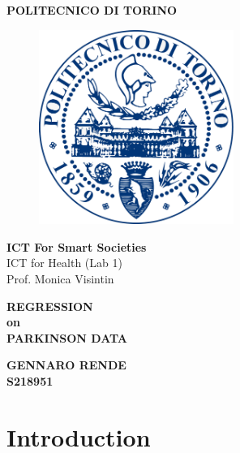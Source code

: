 \documentclass[12pt]{report}
\begin{document}

\begin{center}
\textbf{\Huge POLITECNICO DI TORINO}

\begin{figure}[H]
  \centering
  \includegraphics[width=2.5in]{poli.png}
\end{figure}

\end{center}
\begin{center}
\vspace{0.05in}
\Large{\textbf{ICT For Smart Societies}\\
\vspace{0.08in}
\Large ICT for Health (Lab 1)}\\
\large Prof. Monica Visintin
\end{center}
\begin{center}
\vspace{0.08in}
\end{center}

\begin{center}
\textbf{\Huge REGRESSION\\ on\\ PARKINSON DATA\\}
\end{center}


\begin{center}
\vspace{1in}
\textbf{\Large GENNARO RENDE}\\
\textbf{S218951}\\
\end{center}


\pagebreak


\tableofcontents


\chapter{Introduction}
\end{document}
